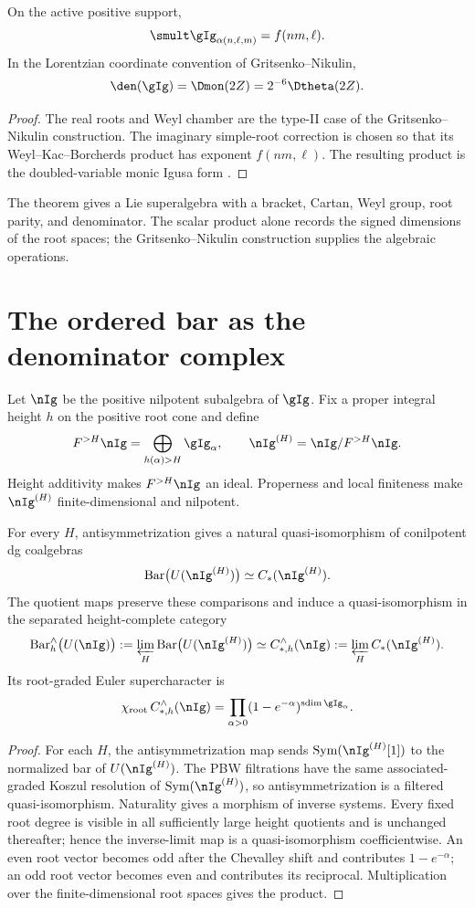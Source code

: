 \begin{theorem}
On the active positive support,
\[
 \smult\gIg_{\alpha(n,\ell,m)}=f(nm,\ell).
\]
In the Lorentzian coordinate convention of Gritsenko--Nikulin,
\[
 \den(\gIg)=\Dmon(2Z)=2^{-6}\Dtheta(2Z).
\]
\end{theorem}
\begin{proof}
The real roots and Weyl chamber are the type-II case of the Gritsenko--Nikulin construction. The imaginary simple-root correction is chosen so that its Weyl--Kac--Borcherds product has exponent $f(nm,\ell)$. The resulting product is the doubled-variable monic Igusa form \cite{GN97,GN98a,GN98b}.
\end{proof}

The theorem gives a Lie superalgebra with a bracket, Cartan, Weyl group, root parity, and denominator. The scalar product alone records the signed dimensions of the root spaces; the Gritsenko--Nikulin construction supplies the algebraic operations.

\chapter{The ordered bar as the denominator complex}
Let $\nIg$ be the positive nilpotent subalgebra of $\gIg$. Fix a proper integral height $h$ on the positive root cone and define
\[
 F^{>H}\nIg=\bigoplus_{h(\alpha)>H}\gIg_\alpha,
 \qquad
 \nIg^{(H)}=\nIg/F^{>H}\nIg.
\]
Height additivity makes $F^{>H}\nIg$ an ideal. Properness and local finiteness make $\nIg^{(H)}$ finite-dimensional and nilpotent.

\begin{theorem}
For every $H$, antisymmetrization gives a natural quasi-isomorphism of conilpotent dg coalgebras
\[
 \Barc\bigl(U(\nIg^{(H)})\bigr)\simeq C_*(\nIg^{(H)}).
\]
The quotient maps preserve these comparisons and induce a quasi-isomorphism in the separated height-complete category
\[
 \Barc_h^\wedge\bigl(U(\nIg)\bigr)
 :=\varprojlim_H\Barc\bigl(U(\nIg^{(H)})\bigr)
 \simeq
 C_{*,h}^\wedge(\nIg)
 :=\varprojlim_H C_*(\nIg^{(H)}).
\]
Its root-graded Euler supercharacter is
\[
 \chi_{\mathrm{root}}\,C_{*,h}^\wedge(\nIg)
 =\prod_{\alpha>0}
 (1-e^{-\alpha})^{\sdim\gIg_\alpha}.
\]
\end{theorem}
\begin{proof}
For each $H$, the antisymmetrization map sends $\Sym(\nIg^{(H)}[1])$ to the normalized bar of $U(\nIg^{(H)})$. The PBW filtrations have the same associated-graded Koszul resolution of $\Sym(\nIg^{(H)})$, so antisymmetrization is a filtered quasi-isomorphism. Naturality gives a morphism of inverse systems. Every fixed root degree is visible in all sufficiently large height quotients and is unchanged thereafter; hence the inverse-limit map is a quasi-isomorphism coefficientwise. An even root vector becomes odd after the Chevalley shift and contributes $1-e^{-\alpha}$; an odd root vector becomes even and contributes its reciprocal. Multiplication over the finite-dimensional root spaces gives the product.
\end{proof}

